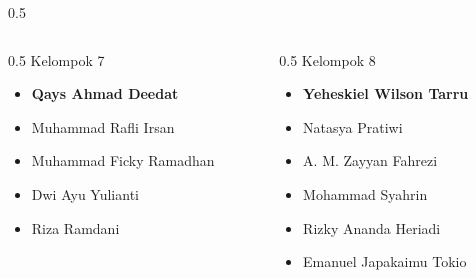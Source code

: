 \documentclass[../main.tex]{subfiles}
\begin{document}
\begin{frame}[mytitle=standard,t,mycolor=digiPH_gray,light]
\begin{columns}
\begin{column}{0.5\textwidth}
		\end{column}
	\end{columns}
\end{frame}


\begin{frame}[mytitle=standard,t,mycolor=digiPH_ocean,dark]
	\begin{columns}
		\begin{column}{0.5\textwidth}
			Kelompok 7
			\begin{itemize}
				\item \textbf{Qays Ahmad Deedat}
				\item Muhammad Rafli Irsan
				\item Muhammad Ficky Ramadhan
				\item Dwi Ayu Yulianti
				\item Riza Ramdani
			\end{itemize}
		\end{column}
		\begin{column}{0.5\textwidth}
			Kelompok 8
			\begin{itemize}
				\item \textbf{Yeheskiel Wilson Tarru}
				\item Natasya Pratiwi
				\item A. M. Zayyan Fahrezi
				\item Mohammad Syahrin
				\item Rizky Ananda Heriadi
				\item Emanuel Japakaimu Tokio
			\end{itemize}
		\end{column}
	\end{columns}


\end{frame}

\begin{frame}[mytitle=standard,t,mycolor=digiPH_uniblue,light]



\end{frame}
\end{document}
